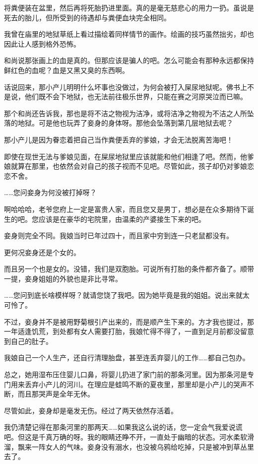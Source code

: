 \documentclass[portrait,a4paper]{article}
\begin{document}
将粪便装在盆里，然后再将死胎扔进里面。真的是毫无慈悲心的用力一扔。虽说是死去的胎儿，但所受到的待遇却与粪便血块完全相同。

我曾在庙里的地狱草纸上看过描绘着同样情节的画作。绘画的技巧虽然拙劣，却也因此让人感到格外恐怖。

和尚说那张画上的血是真的。但那应该是骗人的吧。怎么可能会有那种永远都保持鲜红色的血呢？血是又黑又臭的东西啊。

话说回来，那小产儿明明什么坏事也没做过，为何会被打入屎尿地狱呢。佛书上不是说，他们既不会下地狱，也无法前往极乐世界，只能在赛之河原哭泣而已嘛。

那个和尚还告诉我，那也是将不洁之物视为洁净，或将洁净之物视为不洁之人所坠落的地狱。可是他也玩弄了妾身的身体呀。那他会坠落到第几层地狱去呢？

那小产儿是因为眷恋着把自己当作粪便丢弃的爹娘，才会无法脱离苦海吧！

即使在现世无法与爹娘见面，在屎尿地狱里应该就能和他们相逢了吧。然而，他爹娘就算在那里，也依然会对自己的孩子视而不见吧。尽管如此，孩子却仍对爹娘恋恋不舍。

……您问妾身为何没被打掉呀？

啊哈哈哈，老爷您府上一定是富贵人家，而且您又是男丁，想必是在众多期待下诞生的吧。您应该是在豪华的宅院里，由温柔的产婆接生下来的吧。

妾身则完全不同。我娘当时已年过四十，而且家中穷到连一只老鼠都没有。

更何况妾身还是个女的。

而且另一个也是女的。没错，我们是双胞胎。可说所有打胎的条件都齐备了。顺带一提，妾身姐姐的外貌也是非比寻常。

……您问到底长啥模样呀？就请您饶了我吧。因为她毕竟是我的姐姐。说出来就太可怜了。

不过，妾身并不是被用野菊根引产出来的，而是顺产生下来的。方才我也提过，那一年适逢饥荒，到处都有女人需要打胎，我娘忙得不得了，一直到足月前都没留意到自己的肚子。

我娘自己一个人生产，还自行清理胎盘，甚至连丢弃婴儿的工作……都自己包办。

总之，她用湿布压住婴儿口鼻，将婴儿扔进了家门前的那条河里。因为那条河是专门用来丢弃小产儿的河川。在理应是蛙鸣不断的夏夜里，那里却是小产儿的哭声不断，而且那哭声是全年无休。

尽管如此，妾身却是毫发无伤。经过了两天依然存活着。

我仍清楚记得在那条河里的那两天……如果我这么说的话，您一定会气我爱说谎吧。但这是千真万确的呀。我的眼睛还睁不开，一直处于幽暗的状态。河水柔软滑溜，飘来一阵女人的气味。妾身没有溺水，也没被乌鸦给吃掉，只是被冲到草丛里去了。
\end{document}
